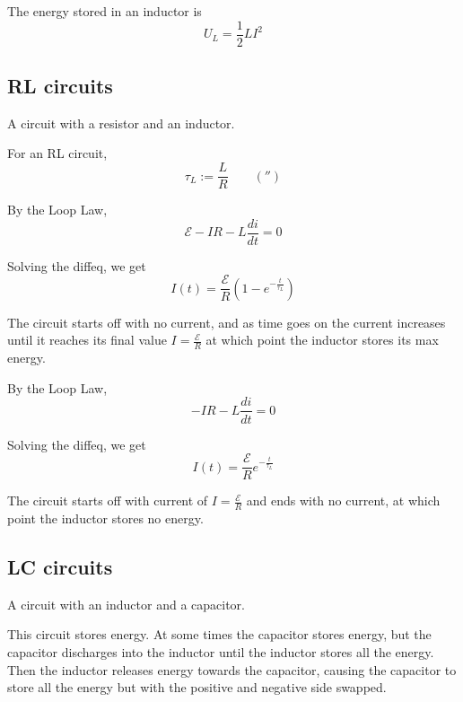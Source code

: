 \begin{theorem}
  The energy stored in an inductor is
  \[
    U_L = \frac{1}{2} LI^2
  \]
\end{theorem}

\subsection{RL circuits}

\begin{definition}[RL circuit]
  A circuit with a resistor and an inductor.
\end{definition}

\begin{definition}
  For an RL circuit,
  \[
    \tau_L := \frac{L}{R} \qquad (\second)
  \]
\end{definition}

\begin{theorem}
  By the Loop Law,
  \[
    \mathcal{E} - IR - L \frac{di}{dt} = 0
  \]

  Solving the diffeq, we get
  \[
    I(t) = \frac{\mathcal{E}}{R} \left(1 - e^{- \frac{t}{\tau_L}}\right)
  \]

  The circuit starts off with no current, and as time goes on the current increases until it reaches its final value $I = \frac{\mathcal{E}}{R}$ at which point the inductor stores its max energy.
\end{theorem}

\begin{theorem}
  By the Loop Law,
  \[
    - IR - L \frac{di}{dt} = 0
  \]

  Solving the diffeq, we get
  \[
    I(t) = \frac{\mathcal{E}}{R} e^{- \frac{t}{\tau_L}}
  \]

  The circuit starts off with current of $I = \frac{\mathcal{E}}{R}$ and ends with no current, at which point the inductor stores no energy.
\end{theorem}

\subsection{LC circuits}

\begin{definition}[LC circuit]
  A circuit with an inductor and a capacitor.

  This circuit stores energy. At some times the capacitor stores energy, but the capacitor discharges into the inductor until the inductor stores all the energy. Then the inductor releases energy towards the capacitor, causing the capacitor to store all the energy but with the positive and negative side swapped.
\end{definition}

